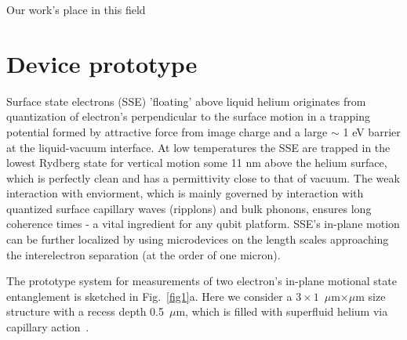 \documentclass[twocolumn,superscriptaddress,unsortedaddress,
 amsmath,amssymb,
 aps,
]{revtex4-2}
\begin{document}
Our work's place in this field


\section{Device prototype} %
Surface state electrons (SSE) 'floating' above liquid helium originates from quantization of electron's perpendicular to the surface motion in a trapping potential formed by attractive force from image charge and a large $\sim$ 1 eV barrier at the liquid-vacuum interface. At low temperatures the SSE are trapped in the lowest Rydberg state for vertical motion some 11 nm above the helium surface, which is perfectly clean and has a permittivity close to that of vacuum. The weak interaction with enviorment, which is mainly governed by interaction with quantized surface capillary waves (ripplons) and bulk phonons, ensures long coherence times - a vital ingredient for any qubit platform. SSE's in-plane motion can be further localized by using microdevices on the length scales approaching the interelectron separation (at the order of one micron).

The prototype system for measurements of two electron's in-plane motional state entanglement is sketched in Fig.~\ref{fig1}a. Here we consider a $3 \times 1$~$\mu$m$\times\mu$m size structure with a recess depth 0.5~$\mu$m, which is filled with superfluid helium via capillary action~\cite{marty1986stability}. 
\end{document}
